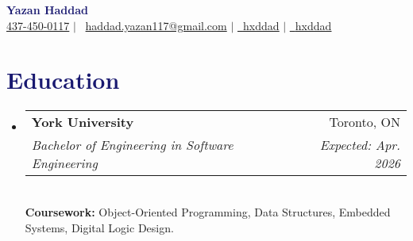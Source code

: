 \documentclass[11pt]{extreport}
\makeatletter
\newcommand{\resumeSubheading}[4]{
  \vspace{-2pt}\item
    \begin{tabular*}{0.97\textwidth}[t]{l@{\extracolsep{\fill}}r}
      \textbf{#1} & #2 \\
      \textit{\small#3} & \textit{\small #4} \\  
    \end{tabular*}\vspace{-7pt}
}
\newcommand{\resumeSubHeadingListStart}{\begin{itemize}[leftmargin=0.15in, label={}]}
\newcommand{\resumeSubHeadingListEnd}{\end{itemize}}
\makeatother
\begin{document}
\begin{center}
    \textbf{\huge \textcolor{MidnightBlue}{Yazan Haddad}} \\ \vspace{8pt}
    \small \raisebox{-0.25ex}{\faPhone} \underline{437-450-0117} $|$ {\faEnvelope \, \underline{haddad.yazan117@gmail.com}} $|$ 
    \href{https://www.linkedin.com/in/hxddad}{\faLinkedin \, \underline{hxddad}} $|$ \href{https://github.com/hxddad}{\faGithub \, \underline{hxddad}}
\end{center}

\section{\textcolor{MidnightBlue}{Education}}
  \resumeSubHeadingListStart
    \resumeSubheading
      {York University}{Toronto, ON}
      {Bachelor of Engineering in Software Engineering}{Expected: Apr. 2026} 
      \vspace{10pt}\\
      \textbf{Coursework:} Object-Oriented Programming, Data Structures, Embedded Systems, Digital Logic Design.\\
  \resumeSubHeadingListEnd

\end{document}
